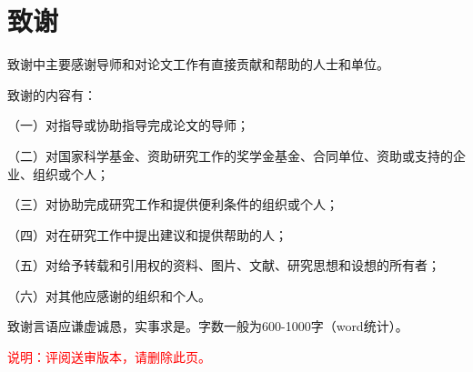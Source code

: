 
    \chapter{致谢}
    致谢中主要感谢导师和对论文工作有直接贡献和帮助的人士和单位。
    
    致谢的内容有：

    （一）对指导或协助指导完成论文的导师；

    （二）对国家科学基金、资助研究工作的奖学金基金、合同单位、资助或支持的企业、组织或个人；

    （三）对协助完成研究工作和提供便利条件的组织或个人；

    （四）对在研究工作中提出建议和提供帮助的人；

    （五）对给予转载和引用权的资料、图片、文献、研究思想和设想的所有者；

    （六）对其他应感谢的组织和个人。

    致谢言语应谦虚诚恳，实事求是。字数一般为600-1000字（word统计）。

    \textcolor{red}{
        说明：评阅送审版本，请删除此页。
    }
